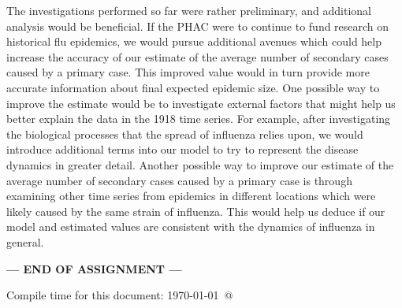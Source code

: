 \documentclass[12pt]{article}\usepackage[]{graphicx}\usepackage[]{color}
\begin{document}
The investigations performed so far were rather preliminary, and additional analysis would be beneficial. If the PHAC were to continue to fund research on historical flu epidemics, we would pursue additional avenues which could help increase the accuracy of our estimate of the average number of secondary cases caused by a primary case. This improved value would in turn provide more accurate information about final expected epidemic size. One possible way to improve the estimate would be to investigate external factors that might help us better explain the data in the 1918 time series. For example, after investigating the biological processes that the spread of influenza relies upon, we would introduce additional terms into our model to try to represent the disease dynamics in greater detail. Another possible way to improve our estimate of the average number of secondary cases caused by a primary case is through examining other time series from epidemics in different locations which were likely caused by the same strain of influenza. This would help us deduce if our model and estimated values are consistent with the dynamics of influenza in general.


\bigskip

\centerline{\bf--- END OF ASSIGNMENT ---}

\bigskip
Compile time for this document:
\today\ @ \thistime
\end{document}
